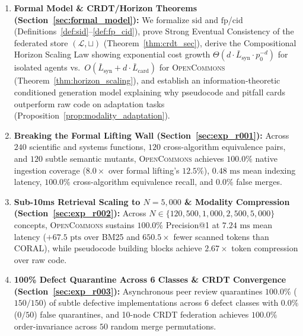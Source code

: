 \documentclass[10pt,twocolumn]{article}
\begin{document}
\begin{enumerate}
    \item \textbf{Formal Model \& CRDT/Horizon Theorems (Section~\ref{sec:formal_model}):} We formalize $\text{sid}$ and $\text{fp}$/$\text{cid}$ (Definitions~\ref{def:sid}--\ref{def:fp_cid}), prove Strong Eventual Consistency of the federated store $(\mathcal{L}, \sqcup)$ (Theorem~\ref{thm:crdt_sec}), derive the Compositional Horizon Scaling Law showing exponential cost growth $\Theta(d \cdot \bar{L}_{\text{syn}} \cdot p_0^{-d})$ for isolated agents vs.\ $O(\bar{L}_{\text{syn}} + d \cdot \bar{L}_{\text{card}})$ for \textsc{OpenCommons} (Theorem~\ref{thm:horizon_scaling}), and establish an information-theoretic conditioned generation model explaining why pseudocode and pitfall cards outperform raw code on adaptation tasks (Proposition~\ref{prop:modality_adaptation}).
    \item \textbf{Breaking the Formal Lifting Wall (Section~\ref{sec:exp_r001}):} Across $240$ scientific and systems functions, $120$ cross-algorithm equivalence pairs, and $120$ subtle semantic mutants, \textsc{OpenCommons} achieves $100.0\%$ native ingestion coverage ($8.0\times$ over formal lifting's $12.5\%$), $0.48\text{ ms}$ mean indexing latency, $100.0\%$ cross-algorithm equivalence recall, and $0.0\%$ false merges.
    \item \textbf{Sub-10ms Retrieval Scaling to $N=5{,}000$ \& Modality Compression (Section~\ref{sec:exp_r002}):} Across $N \in \{120, 500, 1{,}000, 2{,}500, 5{,}000\}$ concepts, \textsc{OpenCommons} sustains $100.0\%$ Precision@1 at $7.24\text{ ms}$ mean latency ($+67.5\text{ pts}$ over BM25 and $650.5\times$ fewer scanned tokens than \textsc{CORAL}), while pseudocode building blocks achieve $2.67\times$ token compression over raw code.
    \item \textbf{100\% Defect Quarantine Across 6 Classes \& CRDT Convergence (Section~\ref{sec:exp_r003}):} Asynchronous peer review quarantines $100.0\%$ ($150/150$) of subtle defective implementations across 6 defect classes with $0.0\%$ ($0/50$) false quarantines, and 10-node CRDT federation achieves $100.0\%$ order-invariance across $50$ random merge permutations.

\end{enumerate}
\end{document}

